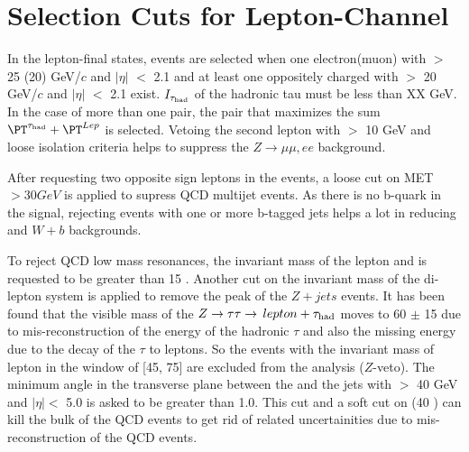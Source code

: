 \section{\texorpdfstring{Selection Cuts for Lepton-\Tau Channel}{Selection Cuts for Lepton-Tau Channel}}
\label{sect:eleTauCuts}

In the lepton-\Tau final states, events are selected when one electron(muon) with \PT $>$ 25 (20) GeV/$c$ and $|\eta|$ $<$ 2.1 and at least 
one oppositely charged \Tau with \PT $>$ 20 GeV/$c$ and $|\eta|$ $<$ 2.1 exist. $I_{\tau_{\rm had}}$ of the hadronic tau must be less than XX GeV.
In the case of more than one pair, the pair that maximizes the sum $\PT^{\Tau} + \PT^{Lep}$ is selected.
Vetoing the second lepton with \PT $>$ 10 GeV and loose isolation criteria helps to suppress the $Z\rightarrow \mu\mu, ee$ background.

After requesting two opposite sign leptons in the events, a loose cut on MET $>30 GeV$ is applied to supress QCD multijet events. 
As there is no b-quark in the signal, rejecting events with one or more b-tagged jets helps a lot in reducing \ttbar and $W+b$ backgrounds.

To reject QCD low mass resonances, the invariant mass of the lepton and \Tau is requested to be greater than 15 \GeV. 
Another cut on the invariant mass of the di-lepton system is applied to remove the peak of the $Z+jets$ events. 
It has been found that the visible mass of the $Z\to\tau\tau\to\,lepton +\tau_{\rm had}$ moves to 60 $\pm$ 15 \GeV due to 
mis-reconstruction of the energy of the hadronic $\tau$ and also the missing energy due to the decay of the $\tau$ to leptons. 
So the events with the invariant mass of lepton \Tau in the window of [45, 75] are excluded from the analysis ($Z$-veto). 
The minimum angle in the transverse plane between the \MET and the jets with \PT $>$ 40 GeV and $|\eta| <$ 5.0 
is asked to be greater than 1.0. This cut and a soft cut on \mttwo (40 \GeV) can kill the bulk of the QCD events 
to get rid of related uncertainities due to mis-reconstruction of the QCD events. 


